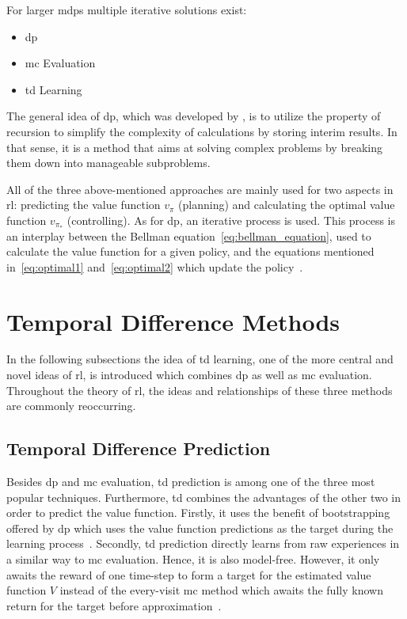 \documentclass[draft,final]{vutinfth} %
\newcommand{\p}[1]{see p. #1}
\begin{document}
    For larger \glspl{mdp} multiple iterative solutions exist:
    \begin{itemize}
        \item \gls{dp}
        \item \gls{mc} Evaluation
        \item \gls{td} Learning
    \end{itemize}

    The general idea of \gls{dp}, which was developed by \citeauthor{bellman_theory_1954}, is to utilize the property of recursion to simplify the complexity of calculations by storing interim results.
    In that sense, it is a method that aims at solving complex problems by breaking them down into manageable subproblems.

    All of the three above-mentioned approaches are mainly used for two aspects in \gls{rl}: predicting the value function $v_\pi$ (planning) and calculating the optimal value function $v_{\pi_*}$ (controlling).
    As for \gls{dp}, an iterative process is used.
    This process is an interplay between the Bellman equation~\eqref{eq:bellman_equation}, used to calculate the value function for a given policy, and the equations mentioned in~\ref{eq:optimal1} and~\ref{eq:optimal2} which update the policy~.


    \section{Temporal Difference Methods}

    In the following subsections the idea of \gls{td} learning, one of the more central and novel ideas of \gls{rl}, is introduced which combines \gls{dp} as well as \gls{mc} evaluation.
    Throughout the theory of \gls{rl}, the ideas and relationships of these three methods are commonly reoccurring.

    \subsection{Temporal Difference Prediction}
    Besides \gls{dp} and \gls{mc} evaluation, \gls{td} prediction is among one of the three most popular techniques.
    Furthermore, \gls{td} combines the advantages of the other two in order to predict the value function.
    Firstly, it uses the benefit of bootstrapping offered by \gls{dp} which uses the value function predictions as the target during the learning process~\citep[\p{18}]{szepesvari_algorithms_2010}.
    Secondly, \gls{td} prediction directly learns from raw experiences in a similar way to \gls{mc} evaluation.
    Hence, it is also model-free.
    However, it only awaits the reward of one time-step to form a target for the estimated value function $V$ instead of the every-visit \gls{mc} method which awaits the fully known return for the target before approximation~\citep[\p{120}]{sutton_reinforcement_2018}.
\end{document}
